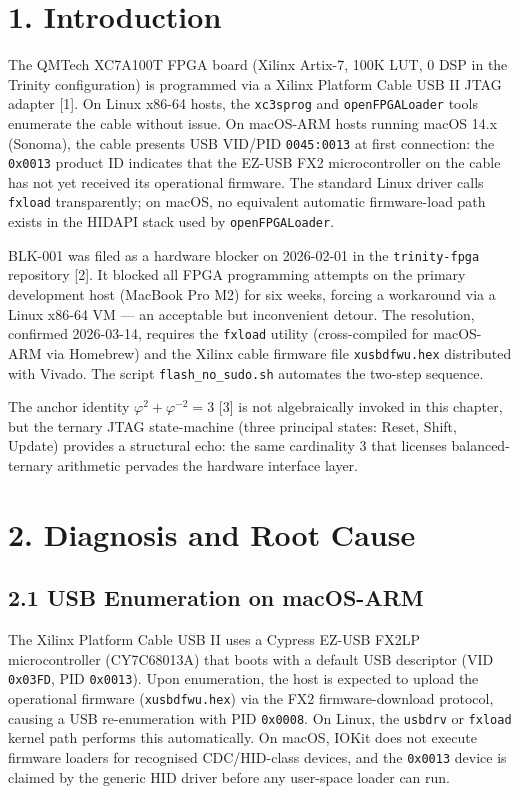 \section{1. Introduction}\label{fa_33:introduction}

The QMTech XC7A100T FPGA board (Xilinx Artix-7,
100K LUT, 0 DSP in the Trinity configuration) is
programmed via a Xilinx Platform Cable USB II JTAG
adapter [1]. On Linux x86-64 hosts, the
\texttt{xc3sprog} and \texttt{openFPGALoader}
tools enumerate the cable without issue. On
macOS-ARM hosts running macOS 14.x (Sonoma), the
cable presents USB VID/PID \texttt{0045:0013} at
first connection: the \texttt{0x0013} product ID
indicates that the EZ-USB FX2 microcontroller on
the cable has not yet received its operational
firmware. The standard Linux driver calls
\texttt{fxload} transparently; on macOS, no
equivalent automatic firmware-load path exists in
the HIDAPI stack used by \texttt{openFPGALoader}.

BLK-001 was filed as a hardware blocker on
2026-02-01 in the \texttt{trinity-fpga} repository
[2]. It blocked all FPGA programming attempts
on the primary development host (MacBook Pro M2)
for six weeks, forcing a workaround via a Linux
x86-64 VM --- an acceptable but inconvenient
detour. The resolution, confirmed 2026-03-14,
requires the \texttt{fxload} utility
(cross-compiled for macOS-ARM via Homebrew) and
the Xilinx cable firmware file
\texttt{xusbdfwu.hex} distributed with Vivado. The
script \texttt{flash\_no\_sudo.sh} automates the
two-step sequence.

The anchor identity
\(\varphi^2 + \varphi^{-2} = 3\) [3] is not
algebraically invoked in this chapter, but the
ternary JTAG state-machine (three principal
states: Reset, Shift, Update) provides a
structural echo: the same cardinality \(3\) that
licenses balanced-ternary arithmetic pervades the
hardware interface layer.

\section{2. Diagnosis and Root
Cause}\label{fa_33:diagnosis-and-root-cause}

\subsection{2.1 USB Enumeration on
macOS-ARM}\label{fa_33:usb-enumeration-on-macos-arm}

The Xilinx Platform Cable USB II uses a Cypress
EZ-USB FX2LP microcontroller (CY7C68013A) that
boots with a default USB descriptor (VID
\texttt{0x03FD}, PID \texttt{0x0013}). Upon
enumeration, the host is expected to upload the
operational firmware (\texttt{xusbdfwu.hex}) via
the FX2 firmware-download protocol, causing a USB
re-enumeration with PID \texttt{0x0008}. On Linux,
the \texttt{usbdrv} or \texttt{fxload} kernel path
performs this automatically. On macOS, IOKit does
not execute firmware loaders for recognised
CDC/HID-class devices, and the \texttt{0x0013}
device is claimed by the generic HID driver before
any user-space loader can run.

